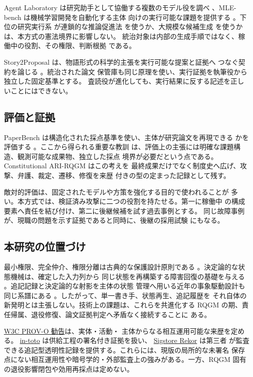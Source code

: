 Agent Laboratory は研究助手として協働する複数のモデル役を調べ
\cite{schmidgall2025agent}、MLE-bench は機械学習開発を自動化する主体
向けの実行可能な課題を提供する \cite{chan2024mle}。下位の研究実行系
が連鎖的な推論促進法 \cite{wei2022chain} を使うか、大規模な候補生成
\cite{li2022competition} を使うかは、本方式の憲法境界に影響しない。
統治対象は内部の生成手順ではなく、稼働中の役割、その権限、判断根拠
である。

Story2Proposal は、物語形式の科学的主張を実行可能な提案と証拠へ
つなぐ契約を論じる \cite{qian2026story2proposal}。統治された論文
保管庫も同じ原理を使い、実行証拠を執筆役から独立した固定基準とする。
査読役が進化しても、実行結果に反する記述を正しいことにはできない。

\subsection{評価と証拠}\label{sec:related:eval}

PaperBench は構造化された採点基準を使い、主体が研究論文を再現できる
かを評価する \cite{starace2025paperbench}。ここから得られる重要な教訓
は、評価上の主張には明確な課題構造、観測可能な成果物、独立した採点
境界が必要だという点である。Constitutional ARI-RQGM はこの考えを
最終成果だけでなく制度史へ広げ、攻撃、弁護、裁定、遷移、修復を来歴
付きの型の定まった記録として残す。

敵対的評価は、固定されたモデルや方策を強化する目的で使われることが
多い。本方式では、検証済み攻撃に二つの役割を持たせる。第一に稼働中
の構成要素へ責任を結び付け、第二に後継候補を試す過去事例とする。
同じ故障事例が、現職の問題を示す証拠であると同時に、後継の採用試験
にもなる。

\subsection{本研究の位置づけ}\label{sec:related:foundations}

最小権限、完全仲介、権限分離は古典的な保護設計原則である
\cite{saltzer1975protection}。決定論的な状態機械は、確定した入力列から
同じ状態を再構築する障害回復の基礎を与える
\cite{schneider1990implementing}。追記記録と決定論的な射影を主体の状態
管理へ用いる近年の事象駆動設計も同じ系譜にある
\cite{nakajima2026the}。したがって、単一書き手、状態再生、追記履歴を
それ自体の新発明とは主張しない。技術上の課題は、これらを共進化する
RQGM の期、責任帰属、退役修復、論文証拠判定へ矛盾なく接続することに
ある。

\href{https://www.w3.org/TR/prov-o/}{W3C PROV-O 勧告}は、実体・活動・
主体からなる相互運用可能な来歴を定める。
\href{https://www.usenix.org/conference/usenixsecurity19/presentation/torres-arias}{in-toto}
は供給工程の署名付き証拠を扱い、
\href{https://docs.sigstore.dev/logging/overview/}{Sigstore Rekor} は第三者
が監査できる追記型透明性記録を提供する。これらには、現版の局所的な未署名
保存点にない相互運用性や暗号学的・外部監査上の強みがある。一方、RQGM
固有の退役影響閉包や効用再採点は定めない。

